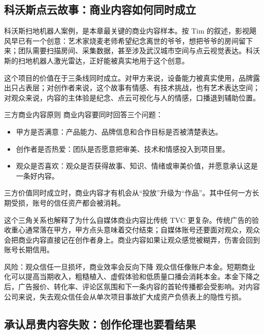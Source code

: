 \subsection{科沃斯点云故事：商业内容如何同时成立}

科沃斯扫地机器人案例，是本章最关键的商业内容样本。按 Tim 的叙述，影视飓风早已有一个创意：艺术家烧麦老师希望纪念离世的爷爷，想把爷爷的房间留下来；团队需要扫描房间、采集数据，甚至涉及武汉城市空间与点云视觉表达。科沃斯的扫地机器人激光雷达，正好能被真实地用于这个创意。

这个项目的价值在于三条线同时成立。对甲方来说，设备能力被真实使用，品牌露出只占表层；对创作者来说，这个故事有情感、有技术挑战，也有艺术表达空间；对观众来说，内容的主体验是纪念、点云可视化与人的情感，口播退到辅助位置。

\begin{importantbox}{三方商业内容原则}
商业内容要同时回答三个问题：

\begin{itemize}
  \item 甲方是否满意：产品能力、品牌信息和合作目标是否被清楚表达。
  \item 创作者是否热爱：团队是否愿意把审美、技术和情感投入到项目里。
  \item 观众是否喜欢：观众是否获得故事、知识、情绪或审美价值，并愿意承认这是一条好内容。
\end{itemize}

三方价值同时成立时，商业内容才有机会从“投放”升级为“作品”。其中任何一方长期受损，账号的信任资产都会被消耗。
\end{importantbox}

这个三角关系也解释了为什么自媒体商业内容比传统 TVC 更复杂。传统广告的验收重心通常落在甲方，甲方点头意味着交付结束；自媒体账号还要面对观众，观众会把商业内容直接记在创作者身上。商业内容如果让观众感觉被糊弄，伤害会回到账号长期信用。

\begin{warningbox}{风险：观众信任一旦损坏，商业效率会反向下降}
观众信任像账户本金。短期商业化可以提高当期收入，粗糙植入、虚假体验和低质量口播会消耗本金。本金下降之后，广告报价、转化率、评论区氛围和下一条内容的首轮传播都会受影响。对内容公司来说，失去观众信任会从单次项目事故扩大成资产负债表上的隐性亏损。
\end{warningbox}

\subsection{承认昂贵内容失败：创作伦理也要看结果}

